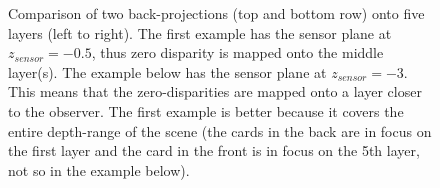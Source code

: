 \documentclass[11pt,a4paper,titlepage]{article}
\begin{document}
\begin{figure}
	\caption{Comparison of two back-projections (top and bottom row) onto five layers (left to right). The first example has the sensor plane at $z_{sensor} = -0.5$, thus zero disparity is mapped onto the middle layer(s). The example below has the sensor plane at $z_{sensor} = -3$. This means that the zero-disparities are mapped onto a layer closer to the observer. The first example is better because it covers the entire depth-range of the scene (the cards in the back are in focus on the first layer and the card in the front is in focus on the 5th layer, not so in the example below).}
	\label{fig:comparison_of_two_backprojections}
\end{figure}


\clearpage


\end{document}
